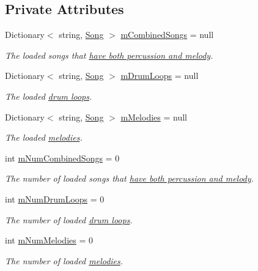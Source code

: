 \subsection*{Private Attributes}
\begin{DoxyCompactItemize}
\item 
Dictionary$<$ string, \hyperlink{class_song}{Song} $>$ \hyperlink{group___s_m_priv_var_gaf6b4ff41b8da95d10ad3db62df111faa}{m\+Combined\+Songs} = null
\begin{DoxyCompactList}\small\item\em The loaded songs that \hyperlink{group___song_group_DocSongCombined}{have both percussion and melody}. \end{DoxyCompactList}\item 
Dictionary$<$ string, \hyperlink{class_song}{Song} $>$ \hyperlink{group___s_m_priv_var_ga84f25335035755448d11acb9287360f2}{m\+Drum\+Loops} = null
\begin{DoxyCompactList}\small\item\em The loaded \hyperlink{group___song_group_DocSongDrumLoop}{drum loops}. \end{DoxyCompactList}\item 
Dictionary$<$ string, \hyperlink{class_song}{Song} $>$ \hyperlink{group___s_m_priv_var_ga935e80f645d0546003f7df8443b79242}{m\+Melodies} = null
\begin{DoxyCompactList}\small\item\em The loaded \hyperlink{group___song_group_DocSongMelody}{melodies}. \end{DoxyCompactList}\item 
int \hyperlink{group___s_m_priv_var_gae423c7b9efd0e2ef721820318200e5f9}{m\+Num\+Combined\+Songs} = 0
\begin{DoxyCompactList}\small\item\em The number of loaded songs that \hyperlink{group___song_group_DocSongCombined}{have both percussion and melody}. \end{DoxyCompactList}\item 
int \hyperlink{group___s_m_priv_var_ga0ea9b6c8343a9b2cbe0eb375edaef247}{m\+Num\+Drum\+Loops} = 0
\begin{DoxyCompactList}\small\item\em The number of loaded \hyperlink{group___song_group_DocSongDrumLoop}{drum loops}. \end{DoxyCompactList}\item 
int \hyperlink{group___s_m_priv_var_ga58ea3b4f794b9e444eece384ae6e8197}{m\+Num\+Melodies} = 0
\begin{DoxyCompactList}\small\item\em The number of loaded \hyperlink{group___song_group_DocSongMelody}{melodies}. \end{DoxyCompactList}\end{DoxyCompactItemize}


